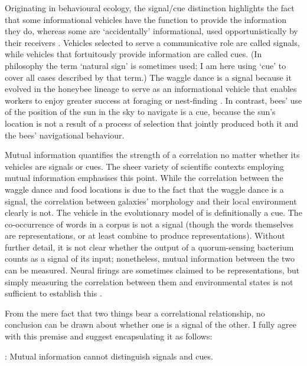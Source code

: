 \documentclass[12pt]{article}
\begin{document}
Originating in behavioural ecology, the signal/cue distinction highlights the fact that some informational vehicles have the function to provide the information they do, whereas some are `accidentally' informational, used opportunistically by their receivers \citep[$\S$1.2]{maynardsmith2003animal}.
Vehicles selected to serve a communicative role are called signals, while vehicles that fortuitously provide information are called cues.
(In philosophy the term `natural sign' is sometimes used; I am here using `cue' to cover all cases described by that term.)
The waggle dance is a signal because it evolved in the honeybee lineage to serve as an informational vehicle that enables workers to enjoy greater success at foraging or nest-finding \citep{gould1975honey,riley2005flight}.
In contrast, bees' use of the position of the sun in the sky to navigate is a cue, because the sun's location is not a result of a process of selection that jointly produced both it and the bees' navigational behaviour.

Mutual information quantifies the strength of a correlation no matter whether its vehicles are signals or cues.
The sheer variety of scientific contexts employing mutual information emphasises this point.
While the correlation between the waggle dance and food locations is due to the fact that the waggle dance is a signal, the correlation between galaxies' morphology and their local environment clearly is not.
The vehicle in the evolutionary model of \citet{donaldson-matasci2010fitness} is definitionally a cue.
The co-occurrence of words in a corpus is not a signal (though the words themselves are representations, or at least combine to produce representations).
Without further detail, it is not clear whether the output of a quorum-sensing bacterium counts as a signal of its input; nonetheless, mutual information between the two can be measured.
Neural firings are sometimes claimed to be representations, but simply measuring the correlation between them and environmental states is not sufficient to establish this \citep{rathkopf2017neural}.

From the mere fact that two things bear a correlational relationship, no conclusion can be drawn about whether one is a signal of the other.
I fully agree with this premise and suggest encapsulating it as follows:

\begin{myquote}
\ami: Mutual information cannot distinguish signals and cues.
\end{myquote}
\end{document}
